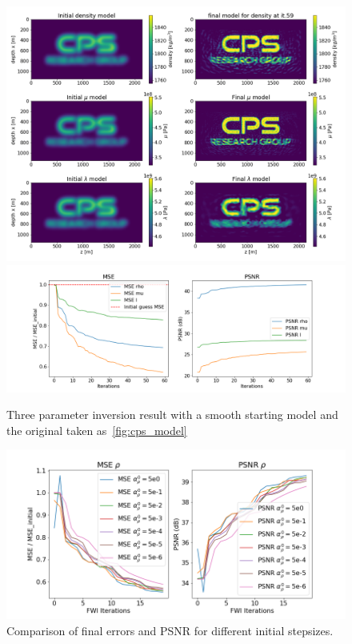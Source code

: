 \documentclass[10pt]{SelfArx} %
\theoremstyle{definition}
\begin{document}
\begin{figure}[!h]\label{fig:cps_fwi_smooth_start}
\hspace*{-0.6in}
\includegraphics[width=1.20\textwidth]{fig/cps_fwi_three_params_smooth}
\hspace*{-0.6in}
\includegraphics[width=1.20\textwidth]{fig/cps_fwi_three_params_smooth_MSE}
\caption{Three parameter inversion result with a smooth starting model and the original taken as~\cref{fig:cps_model}}
\end{figure}
\begin{figure}[!h]\label{fig:cps_alpha_comparison}
\hspace*{-0.4in}
\includegraphics[width=1.15\textwidth]{fig/alpha_comparison}
\caption{Comparison of final errors and PSNR for different initial stepsizes.}
\end{figure}
\end{document}
